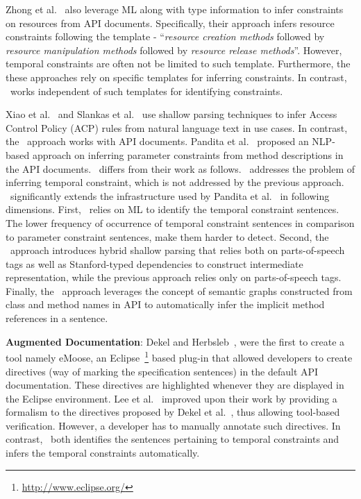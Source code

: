 Zhong et al.~\cite{zhong09SE} also leverage ML along with type information to infer constraints on resources from API documents.
Specifically, their approach infers resource constraints following the template - ``\textit{resource creation methods} followed by \textit{resource manipulation methods} followed by \textit{resource release methods}''.
However, temporal constraints are often not be limited to such template. 
Furthermore, the these approaches rely on specific templates for inferring constraints. In contrast, \tool\ works independent of such templates for identifying constraints.


Xiao et al.~\cite{XiaoFSE2012} and Slankas et al.~\cite{johnSlankasPASSAT13} use shallow parsing techniques to infer Access Control Policy (ACP) rules from natural language text in use cases. In contrast, the \tool\ approach works with API documents.
Pandita et al.~\cite{pandita12:inferring} proposed an NLP-based approach on inferring parameter constraints from method descriptions in the API documents. \tool\ differs from their work as follows.
\tool\ addresses the problem of inferring temporal constraint, which is not addressed by the previous approach. \tool\ significantly extends the infrastructure used by Pandita et al.~\cite{pandita12:inferring} in following dimensions.
First, \tool\ relies on ML to identify the temporal constraint sentences. The lower frequency of occurrence of temporal constraint sentences in comparison to parameter constraint sentences, make them harder to detect.
Second, the \tool\ approach introduces hybrid shallow parsing that relies both on parts-of-speech tags as well as Stanford-typed dependencies to construct intermediate representation, while the previous approach relies only on parts-of-speech tags.
Finally, the \tool\ approach leverages the concept of semantic graphs constructed from class and method names in API to automatically infer the implicit method references in a sentence. 


\textbf{Augmented Documentation}:
Dekel and Herbsleb~\cite{Dekel2009}, were the first to create a tool namely eMoose,
an Eclipse~\footnote{\url{http://www.eclipse.org/}} based plug-in that allowed developers to create directives
(way of marking the specification sentences) in the default API documentation.
These directives are highlighted whenever they are displayed in the Eclipse environment.
Lee et al.~\cite{lee2012towards} improved upon their work by providing a formalism to the directives proposed by Dekel et al.~\cite{Dekel2009},
thus allowing tool-based verification.
However, a developer has to manually annotate such directives.
In contrast, \tool\ both identifies the sentences pertaining to temporal constraints and infers the temporal constraints automatically.